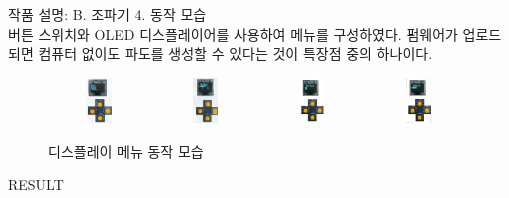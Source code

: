 \documentclass[a0paper,portrait]{baposter}
\begin{document}
\begin{poster}
\begin{posterbox}[name=circuit,column=1,below=wtank, above=bottom]{작품 설명: B. 조파기}
\small {4. 동작 모습}\\
    \scriptsize {버튼 스위치와 OLED 디스플레이어를 사용하여 메뉴를 구성하였다. 펌웨어가 업로드 되면 컴퓨터 없이도 파도를 생성할 수 있다는 것이 특장점 중의 하나이다. }
    \begin{figure}[H]
            \includegraphics[trim=30 1050 100 0, clip, width=0.24\textwidth, height=1.2cm]{images/OLED1.png} 
            \includegraphics[trim=100 1550 100 0, clip, width=0.24\textwidth, height=1.2cm]{images/OLED2.png}
            \includegraphics[trim=30 950 150 0,clip, width=0.24\textwidth, height=1.2cm]{images/OLED3.png}
            \includegraphics[trim=30 950 100 0, clip, width=0.24\textwidth, height=1.2cm]{images/OLED4.png}
        \caption{디스플레이 메뉴 동작 모습}
        \label{Oled}   
    \end{figure} 
    
\end{posterbox}

\begin{posterbox}[name=result,column=2,below=wtank]{RESULT}


\end{posterbox}
\end{poster}
\end{document}
